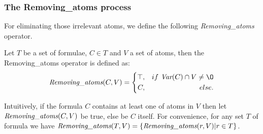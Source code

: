 \documentclass{article}
\begin{document}
\subsubsection{The Removing\_atoms process}
For eliminating those irrelevant atoms, we define the following \emph{Removing\_atoms} operator.
\begin{definition}\label{def:Elm}
Let $T$ be a set of formulae, $C \in T$ and $V$ a set of atoms, then the Removing\_atoms operator is defined as:
$$ \emph{Removing\_atoms}(C, V)=\left\{
\begin{aligned}
\top, && if\ \Var(C) \cap V \neq {\O} \\
C, && else.
\end{aligned}
\right.
$$
\end{definition}
Intuitively, if the formula $C$ contains at least one of atoms in $V$ then let $\emph{Removing\_atoms}(C, V)$ be true, else be $C$ itself.
For convenience, for any set $T$ of formula we have $\emph{Removing\_atoms}(T, V) = \{\emph{Removing\_atoms}(r, V) | r \in T\}$.
\end{document}
